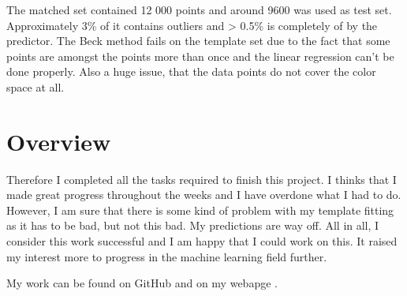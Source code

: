\documentclass[a4paper,12pt]{article}
\begin{document}
\par The matched set contained 12 000 points and around 9600 was used
as test set. Approximately 3\% of it contains outliers and > 0.5\% is completely
of by the predictor. The Beck method fails on the template set due to the 
fact that some points are amongst the points more than once and the 
linear regression can't be done properly. Also a huge issue, that 
the data points do not cover the color space at all.

\section{Overview}

\par Therefore I completed all the tasks required to finish this project. I thinks that I made 
great progress throughout the weeks and I have overdone what I had to do. However, I am sure that 
there is some kind of problem with my template fitting as it has to be bad, but not this bad. My predictions
are way off. All in all, I consider this work successful and I am happy that I could work on this. It 
raised my interest more to progress in the machine learning field further.

\par My work can be found on GitHub \cite{qbeer} and on my webapge \cite{myblog}.

\newpage


\end{document}

